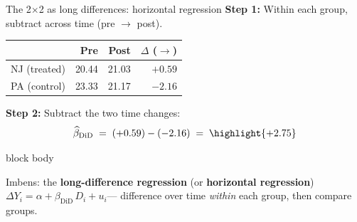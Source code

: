 \documentclass[aspectratio=169,11pt]{beamer}
\newcommand{\emphbox}[1]{%
  \begin{beamercolorbox}[rounded=true,sep=7pt,wd=\linewidth]{block body}%
    \small\color{slate}\raggedright #1%
  \end{beamercolorbox}}
\begin{document}
\begin{frame}{The 2$\times$2 as long differences: horizontal regression}
\vspace{0.2em}
\small
\textbf{Step 1:} Within each group, subtract across time (pre $\rightarrow$ post).
\vspace{0.4em}
\begin{center}
\renewcommand{\arraystretch}{1.5}
\begin{tabular}{@{}l rr r@{}}
\toprule
 & \textbf{Pre} & \textbf{Post} & \textbf{$\Delta$ ($\rightarrow$)} \\
\midrule
NJ (treated) & 20.44 & 21.03 & \textcolor{accent}{$+0.59$} \\
PA (control) & 23.33 & 21.17 & \textcolor{slate}{$-2.16$} \\
\bottomrule
\end{tabular}
\end{center}
\vspace{0.3em}
\textbf{Step 2:} Subtract the two time changes:
\[
  \widehat{\beta}_{\text{DiD}} \;=\; (+0.59) - (-2.16) \;=\; \highlight{+2.75}
\]
\vspace{0.1em}
\emphbox{Imbens: the \textbf{long-difference regression} (or \textbf{horizontal regression})\\[3pt]
$\Delta Y_i = \alpha + \beta_{\text{DiD}}\, D_i + u_i$\quad --- difference over time \textit{within} each group, then compare groups.}
\end{frame}
\end{document}
